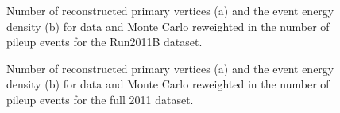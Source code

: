 \begin{figure}[hbt]
\begin{center}
\caption{\label{fig:PUValidation_Run2011B} Number of reconstructed primary vertices (a) and
the event energy density (b) for data and Monte Carlo reweighted in the number
of pileup events for the Run2011B dataset.}
\end{center}
\end{figure}

\begin{figure}[hbt]
\begin{center}
\caption{\label{fig:PUValidation_Full2011} Number of reconstructed primary vertices (a) and
the event energy density (b) for data and Monte Carlo reweighted in the number
of pileup events for the full 2011 dataset.}
\end{center}
\end{figure}

